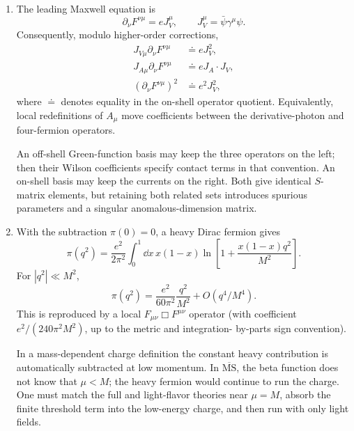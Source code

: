 \begin{enumerate}
\begin{enumerate}
Candidate derivative bilinears such as \(\bar\psi D^2\psi\) reduce by
\[
 (\ii\slashed D)^2=-D^2-\frac e2\sigma^{\mu\nu}F_{\mu\nu}
\]
and the Dirac equation to a dipole plus lower-dimensional mass terms.
Total derivatives add nothing.  No pure-photon dimension-five scalar
exists.  Both dipoles are therefore required when discrete symmetries are
not imposed; P or T would eliminate the electric one.
\item
The leading Maxwell equation is
\[
 \partial_\nu F^{\nu\mu}=eJ_V^\mu,\qquad
 J_V^\mu=\bar\psi\gamma^\mu\psi.
\]
Consequently, modulo higher-order corrections,
\[
\begin{aligned}
 J_{V\mu}\partial_\nu F^{\nu\mu}&\doteq eJ_V^2,\\
 J_{A\mu}\partial_\nu F^{\nu\mu}&\doteq eJ_A\cdot J_V,\\
 (\partial_\nu F^{\nu\mu})^2&\doteq e^2J_V^2,
\end{aligned}
\]
where \(\doteq\) denotes equality in the on-shell operator quotient.
Equivalently, local redefinitions of \(A_\mu\) move coefficients between
the derivative-photon and four-fermion operators.

An off-shell Green-function basis may keep the three operators on the left;
then their Wilson coefficients specify contact terms in that convention.
An on-shell basis may keep the currents on the right.  Both give identical
\(S\)-matrix elements, but retaining both related sets introduces spurious
parameters and a singular anomalous-dimension matrix.
\item
With the subtraction \(\pi(0)=0\), a heavy Dirac fermion gives
\[
 \pi(q^2)=\frac{e^2}{2\pi^2}\int_0^1\dd x\,x(1-x)
 \ln\left[1+\frac{x(1-x)q^2}{M^2}\right].
\]
For \(|q^2|\ll M^2\),
\[
 \boxed{\pi(q^2)=\frac{e^2}{60\pi^2}\frac{q^2}{M^2}
 +O(q^4/M^4).}
\]
This is reproduced by a local \(F_{\mu\nu}\Box F^{\mu\nu}\) operator
(with coefficient \(e^2/(240\pi^2M^2)\), up to the metric and integration-
by-parts sign convention).

In a mass-dependent charge definition the constant heavy contribution is
automatically subtracted at low momentum.  In
\(\overline{\mathrm{MS}}\), the beta function does not know that
\(\mu<M\); the heavy fermion would continue to run the charge.  One must
match the full and light-flavor theories near \(\mu=M\), absorb the finite
threshold term into the low-energy charge, and then run with only light
fields.
\end{enumerate}


\end{enumerate}
